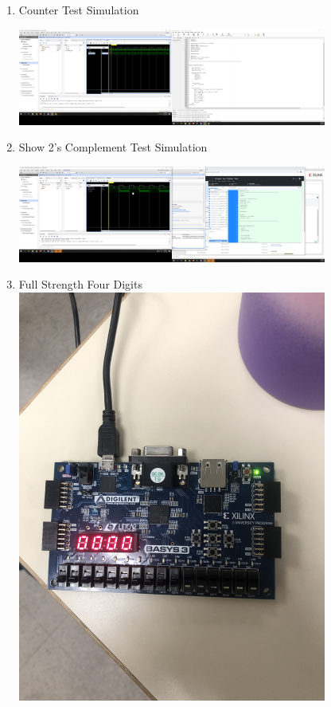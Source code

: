 \documentclass[11pt]{article}
\begin{document}
\begin{enumerate}
	
	\item Counter Test Simulation
	
	\includegraphics[width=0.8\textwidth, trim= 28.5cm 16cm 68cm 5.5cm, clip]{counter_test.PNG}
	\label{fig:Counter Test Simulation}
	
	\pagebreak
	
	\item Show 2's Complement Test Simulation 
	
	\includegraphics[width=0.8\textwidth, trim= 28.5cm 16cm 68cm 5.5cm, clip]{show_2c_test.PNG}
	\label{fig:Show 2's Complement Test Simulation}
	
	\item Full Strength Four Digits 
	\includegraphics[width=0.8\textwidth, angle = 270]{allZeros.jpg}
	\label{fig:All Zeros}
	

\end{enumerate}
\end{document}
